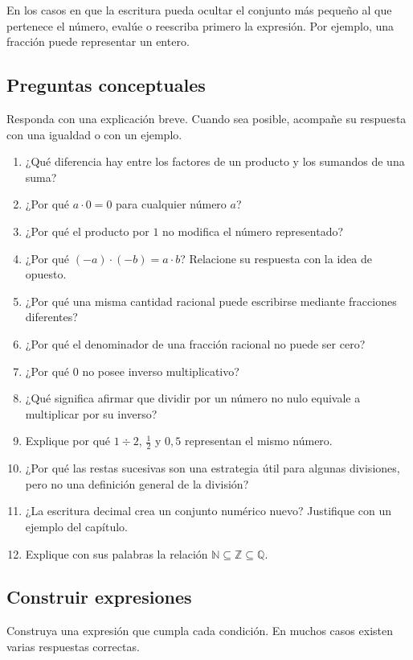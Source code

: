 En los casos en que la escritura pueda ocultar el conjunto más pequeño al que pertenece el número, evalúe o reescriba primero la expresión. Por ejemplo, una fracción puede representar un entero.

\subsection*{Preguntas conceptuales}

Responda con una explicación breve. Cuando sea posible, acompañe su respuesta con una igualdad o con un ejemplo.

\begin{enumerate}
\item ¿Qué diferencia hay entre los factores de un producto y los sumandos de una suma?
\item ¿Por qué \(a\cdot0=0\) para cualquier número \(a\)?
\item ¿Por qué el producto por \(1\) no modifica el número representado?
\item ¿Por qué \((-a)\cdot(-b)=a\cdot b\)? Relacione su respuesta con la idea de opuesto.
\item ¿Por qué una misma cantidad racional puede escribirse mediante fracciones diferentes?
\item ¿Por qué el denominador de una fracción racional no puede ser cero?
\item ¿Por qué \(0\) no posee inverso multiplicativo?
\item ¿Qué significa afirmar que dividir por un número no nulo equivale a multiplicar por su inverso?
\item Explique por qué \(1\div2\), \(\frac12\) y \(0{,}5\) representan el mismo número.
\item ¿Por qué las restas sucesivas son una estrategia útil para algunas divisiones, pero no una definición general de la división?
\item ¿La escritura decimal crea un conjunto numérico nuevo? Justifique con un ejemplo del capítulo.
\item Explique con sus palabras la relación \(\mathbb N\subseteq\mathbb Z\subseteq\mathbb Q\).
\end{enumerate}

\subsection*{Construir expresiones}

Construya una expresión que cumpla cada condición. En muchos casos existen varias respuestas correctas.

